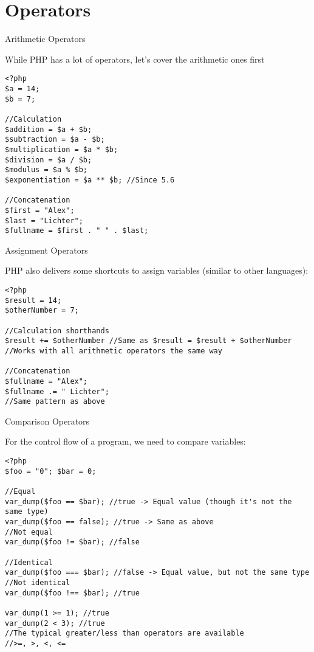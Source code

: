 \section{Operators}

\begin{frame}[fragile]{Arithmetic Operators}

While PHP has a lot of operators, let's cover the arithmetic ones first \pause

\begin{lstlisting}
<?php
$a = 14;
$b = 7;

//Calculation
$addition = $a + $b;
$subtraction = $a - $b;
$multiplication = $a * $b;
$division = $a / $b;
$modulus = $a % $b;
$exponentiation = $a ** $b; //Since 5.6

//Concatenation
$first = "Alex";
$last = "Lichter";
$fullname = $first . " " . $last;
\end{lstlisting}

\end{frame}

\begin{frame}[fragile]{Assignment Operators}

PHP also delivers some shortcuts to assign variables (similar to other languages):\pause

\begin{lstlisting}
<?php
$result = 14;
$otherNumber = 7;

//Calculation shorthands
$result += $otherNumber //Same as $result = $result + $otherNumber
//Works with all arithmetic operators the same way 

//Concatenation
$fullname = "Alex";
$fullname .= " Lichter";
//Same pattern as above
\end{lstlisting}

\end{frame}

\begin{frame}[fragile]{Comparison Operators}

For the control flow of a program, we need to compare variables:\pause
\begin{lstlisting}
<?php
$foo = "0"; $bar = 0;

//Equal
var_dump($foo == $bar); //true -> Equal value (though it's not the same type)
var_dump($foo == false); //true -> Same as above
//Not equal
var_dump($foo != $bar); //false

//Identical
var_dump($foo === $bar); //false -> Equal value, but not the same type
//Not identical
var_dump($foo !== $bar); //true

var_dump(1 >= 1); //true
var_dump(2 < 3); //true
//The typical greater/less than operators are available 
//>=, >, <, <=
\end{lstlisting}

\end{frame}

